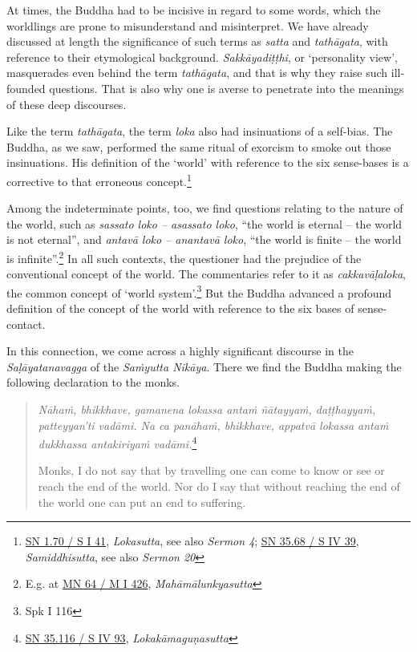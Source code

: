 At times, the Buddha had to be incisive in regard to some words, which the worldlings are prone to misunderstand and misinterpret. We have already discussed at length the significance of such terms as \emph{satta} and \emph{tathāgata}, with reference to their etymological background. \emph{Sakkāyadiṭṭhi}, or `personality view', masquerades even behind the term \emph{tathāgata}, and that is why they raise such ill-founded questions. That is also why one is averse to penetrate into the meanings of these deep discourses.

Like the term \emph{tathāgata}, the term \emph{loka} also had insinuations of a self-bias. The Buddha, as we saw, performed the same ritual of exorcism to smoke out those insinuations. His definition of the `world' with reference to the six sense-bases is a corrective to that erroneous concept.\footnote{\href{https://suttacentral.net/sn1.70/pli/ms}{SN 1.70 / S I 41}, \emph{Lokasutta}, see also \emph{Sermon 4}; \href{https://suttacentral.net/sn35.68/pli/ms}{SN 35.68 / S IV 39}, \emph{Samiddhisutta}, see also \emph{Sermon 20}}

Among the indeterminate points, too, we find questions relating to the nature of the world, such as \emph{sassato loko -- asassato loko}, ``the world is eternal -- the world is not eternal'', and \emph{antavā loko -- anantavā loko}, ``the world is finite -- the world is infinite''.\footnote{E.g. at \href{https://suttacentral.net/mn64/pli/ms}{MN 64 / M I 426}, \emph{Mahāmālunkyasutta}} In all such contexts, the questioner had the prejudice of the conventional concept of the world. The commentaries refer to it as \emph{cakkavāḷaloka}, the common concept of `world system'.\footnote{Spk I 116} But the Buddha advanced a profound definition of the concept of the world with reference to the six bases of sense-contact.

In this connection, we come across a highly significant discourse in the \emph{Saḷāyatanavagga} of the \emph{Saṁyutta Nikāya}. There we find the Buddha making the following declaration to the monks.

\begin{quote}
\emph{Nāhaṁ, bhikkhave, gamanena lokassa antaṁ ñātayyaṁ, daṭṭhayyaṁ, patteyyan'ti vadāmi. Na ca panāhaṁ, bhikkhave, appatvā lokassa antaṁ dukkhassa antakiriyaṁ vadāmi.}\footnote{\href{https://suttacentral.net/sn35.116/pli/ms}{SN 35.116 / S IV 93}, \emph{Lokakāmaguṇasutta}}

Monks, I do not say that by travelling one can come to know or see or reach the end of the world. Nor do I say that without reaching the end of the world one can put an end to suffering.
\end{quote}


